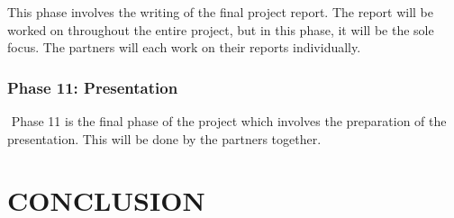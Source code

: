 \documentclass[10pt,twocolumn]{witseiepaper}
\begin{document}
This phase involves the writing of the final project report. The report will be worked on throughout the entire project, but in this phase, it will be the sole focus. The partners will each work on their reports individually.

\subsubsection*{Phase 11: Presentation} $    $
Phase 11 is the final phase of the project which involves the preparation of the presentation. This will be done by the partners together.

\section{CONCLUSION}




\end{document}

